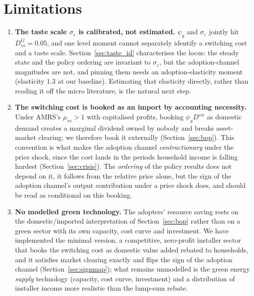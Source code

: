 \section{Limitations}
\label{sec:limits}

\begin{enumerate}\itemsep3pt

\item \textbf{The taste scale $\sigma_{\varepsilon}$ is calibrated, not
estimated.} $\psi_g$ and $\sigma_\varepsilon$ jointly hit $D^G_{ss}=0.05$, and one
level moment cannot separately identify a switching cost and a taste scale.
Section~\ref{sec:taste_id} characterises the locus: the steady state and the
policy ordering are invariant to $\sigma_\varepsilon$, but the adoption-channel
magnitudes are not, and pinning them needs an adoption-elasticity moment
(elasticity $1.3$ at our baseline). Estimating that elasticity directly, rather
than reading it off the micro literature, is the natural next step.

\item \textbf{The switching cost is booked as an import by accounting
necessity.} Under AMRS's $\mu_{ss}>1$ with capitalised profits, booking
$\psi_g D^{sw}$ as domestic demand creates a marginal dividend owned by nobody
and breaks asset-market clearing; we therefore book it externally
(Section~\ref{sec:bop}). This convention is what makes the adoption channel
\emph{contractionary} under the price shock, since the cost lands in the
periods household income is falling hardest (Section~\ref{sec:crisis}). The \emph{ordering}
of the policy results does not depend on it, it follows from the relative
price alone, but the sign of the adoption channel's output contribution under
a price shock does, and should be read as conditional on this booking.

\item \textbf{No modelled green technology.} The adopters' resource saving
rests on the domestic/imported interpretation of Section~\ref{sec:bop} rather
than on a green sector with its own capacity, cost curve and investment. We
have implemented the minimal version, a competitive, zero-profit installer
sector that books the switching cost as domestic value added rebated to
households, and it satisfies market clearing exactly and flips the sign of the
adoption channel (Section~\ref{sec:signmap}); what remains unmodelled is the
green energy \emph{supply} technology (capacity, cost curve, investment) and a
distribution of installer income more realistic than the lump-sum rebate.


\end{enumerate}
